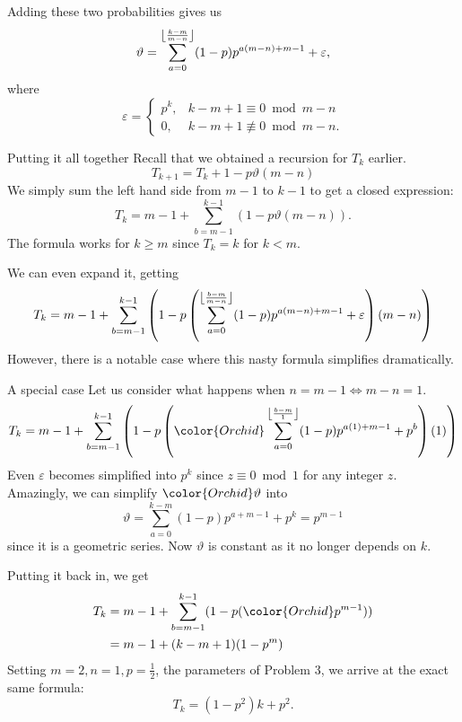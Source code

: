 \documentclass[xcolor={usenames,dvipsnames}]{beamer}
\DeclarePairedDelimiter\floor{\lfloor}{\rfloor}
\begin{document}
\begin{frame}
  Adding these two probabilities gives us \[
    \vartheta = \sum_{a=0}^{\floor*{\frac{k-m}{m-n}}} (1-p)p^{a(m-n)+m-1} + \varepsilon,
  \] where \[
    \varepsilon = \begin{cases} p^{k}, &k-m+1 \equiv 0 \bmod m-n \\ 0, &k-m+1 \not\equiv 0 \bmod m-n. \end{cases}
  \] 
\end{frame}

\begin{frame}{Putting it all together}
  Recall that we obtained a recursion for  $T_k$ earlier.
  \[T_{k+1} = T_k + 1 - p\vartheta(m - n)\]
  We simply sum the left hand side from $m-1$ to $k-1$ to get a closed expression:
  \begin{equation*}
  T_k = m-1 + \sum_{b=m-1}^{k-1} \left(1-p\vartheta(m-n)\right).
  \end{equation*}
  The formula works for $k \ge m$ since $T_k = k$ for  $k<m$.
\end{frame}

\begin{frame}
  We can even expand it, getting
  \[
  T_k = m-1+\sum _{b=m-1}^{k-1} \left(1-p \left(\sum _{a=0}^{\floor*{\frac{b-m}{m-n}} } (1-p) p^{a (m-n)+m-1}+\varepsilon\right) (m-n)\right)
  \] However, there is a notable case where this nasty formula simplifies dramatically.
\end{frame}

\begin{frame}{A special case}
  Let us consider what happens when $n = m-1 \iff m-n = 1$.
  \begin{equation*}
    T_k = m-1+\sum _{b=m-1}^{k-1} \left(1-p \left({\color{Orchid}\sum _{a=0}^{\floor*{\frac{b-m}{1}} } (1-p) p^{a (1)+m-1}+p^{b}}\right) (1)\right)
  \end{equation*}
  Even $\varepsilon$ becomes simplified into $p^{k}$ since $z \equiv 0 \bmod 1$ for any integer  $z$. Amazingly, we can simplify $\color{Orchid} \vartheta$ into  \[
    \vartheta = \sum _{a=0}^{k-m } (1-p) p^{a+m-1}+p^{k} = p^{m-1}
  \] since it is a geometric series. Now $\vartheta$ is constant as it no longer depends on  $k$.
\end{frame}
\begin{frame}
  Putting it back in, we get 
    \begin{align*}
      T_k &= m-1 + \sum_{b=m-1}^{k-1} (1-p({\color{Orchid} p^{m-1}})) \\
          &= m-1 + (k-m+1)(1-p^{m})
    \end{align*}
    Setting $m = 2, n = 1, p = \frac{1}{2}$, the parameters of Problem 3, we arrive at the exact same formula: \[
      T_k = (1 - p^2)k + p^2
    .\] 
\end{frame}
\end{document}
